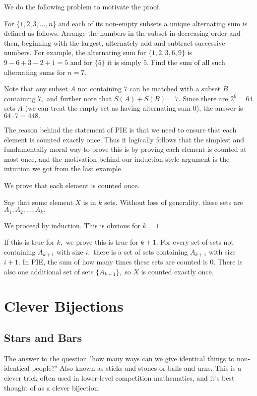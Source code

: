 We do the following problem to motivate the proof.

\begin{exam}[AIME 1983/13]
For $\{1, 2, 3, \ldots, n\}$ and each of its non-empty subsets a unique alternating sum is defined as follows. Arrange the numbers in the subset in decreasing order and then, beginning with the largest, alternately add and subtract successive numbers. For example, the alternating sum for $\{1, 2, 3, 6,9\}$ is $9-6+3-2+1=5$ and for $\{5\}$ it is simply $5$. Find the sum of all such alternating sums for $n=7$. 
\end{exam}

\begin{sol}
Note that any subset $A$ not containing $7$ can be matched with a subset $B$ containing $7,$ and further note that $S(A)+S(B)=7.$ Since there are $2^6=64$ sets $A$ (we can treat the empty set as having alternating sum $0$), the answer is $64\cdot 7=448.$
\end{sol}

The reason behind the statement of PIE is that we need to ensure that each element is counted exactly once. Thus it logically follows that the simplest and fundamentally moral way to prove this is by proving each element is counted at most once, and the motivation behind our induction-style argument is the intuition we got from the last example.

\begin{pro}
We prove that each element is counted once.

Say that some element $X$ is in $k$ sets. Without loss of generality, these sets are $A_1,A_2,\dots,A_k.$

We proceed by induction. This is obvious for $k=1.$

If this is true for $k,$ we prove this is true for $k+1.$ For every set of sets not containing $A_{k+1}$ with size $i,$ there is a set of sets containing $A_{k+1}$ with size $i+1.$ In PIE, the sum of how many times these sets are counted is $0.$ There is also one additional set of sets $\{A_{k+1}\},$ so $X$ is counted exactly once.
\end{pro}


\section{Clever Bijections}

\subsection{Stars and Bars}
The answer to the question "how many ways can we give identical things to non-identical people?" Also known as sticks and stones or balls and urns. This is a clever trick often used in lower-level competition mathematics, and it's best thought of as a clever bijection.

